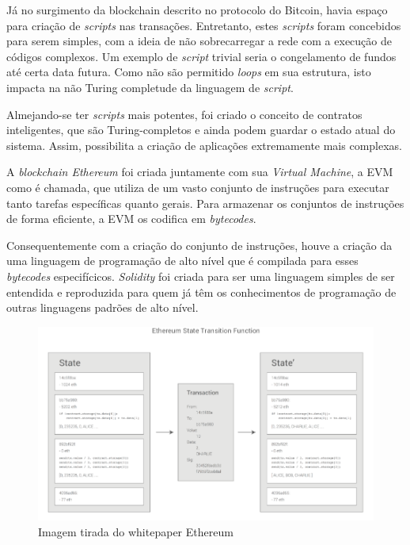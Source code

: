 \documentclass{ufsctex/ufsctex}
\begin{document}
Já no surgimento da blockchain descrito no protocolo do Bitcoin, havia espaço
para criação de \textit{scripts} nas transações. Entretanto, estes
\textit{scripts} foram concebidos para serem simples, com a ideia de não
sobrecarregar a rede com a execução de códigos complexos. Um exemplo de
\textit{script} trivial seria o congelamento de fundos até certa data futura.
Como não são  permitido \textit{loops} em sua estrutura, isto impacta na não
Turing completude da linguagem de \textit{script}.\cite{nakamoto2012bitcoin}

Almejando-se ter \textit{scripts} mais potentes, foi criado o conceito de
contratos inteligentes, que são Turing-completos e ainda podem guardar o estado
atual do sistema.  Assim, possibilita a criação de aplicações extremamente mais
complexas.\cite{ethereum}

A \textit{blockchain Ethereum} foi criada juntamente com sua \textit{Virtual
Machine}, a EVM como é chamada, que
utiliza de um vasto conjunto de instruções para executar tanto tarefas
específicas quanto gerais. Para armazenar os conjuntos de instruções de forma
eficiente, a EVM os codifica em \textit{bytecodes}.\cite{wood2014yellow}

Consequentemente com a criação do conjunto de instruções, houve a criação da uma
linguagem de programação de alto nível que é compilada para esses
\textit{bytecodes} especifícicos.  \textit{Solidity} foi criada para ser uma
linguagem simples de ser entendida e reproduzida para quem já têm os
conhecimentos de programação de outras linguagens padrões de alto nível.
\cite{solidity}

\begin{figure}[h]
	\centering
	\includegraphics[scale=0.3]{ethereum}
	\caption{Imagem tirada do whitepaper Ethereum}
	\label{fig:ethereum}
\end{figure}
\end{document}
